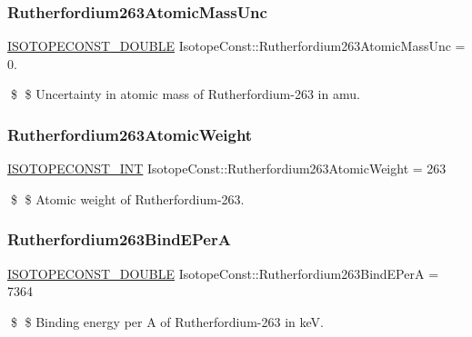 \subsubsection{\texorpdfstring{Rutherfordium263\+Atomic\+Mass\+Unc}{Rutherfordium263AtomicMassUnc}}
{\footnotesize\ttfamily \mbox{\hyperlink{group___isotope_const-_macros_ga8f45a7272ce02c0b4c65c44636ed719a}{I\+S\+O\+T\+O\+P\+E\+C\+O\+N\+S\+T\+\_\+\+D\+O\+U\+B\+LE}} Isotope\+Const\+::\+Rutherfordium263\+Atomic\+Mass\+Unc = 0.}

\$ \$ Uncertainty in atomic mass of Rutherfordium-\/263 in amu. \mbox{\label{group___isotope_const-_rutherfordium-_rf263_gae3bc559599657714de6118653ead2b63}} 
\subsubsection{\texorpdfstring{Rutherfordium263\+Atomic\+Weight}{Rutherfordium263AtomicWeight}}
{\footnotesize\ttfamily \mbox{\hyperlink{group___isotope_const-_macros_ga5f18360b3e99483a35c32d789e62621c}{I\+S\+O\+T\+O\+P\+E\+C\+O\+N\+S\+T\+\_\+\+I\+NT}} Isotope\+Const\+::\+Rutherfordium263\+Atomic\+Weight = 263}

\$ \$ Atomic weight of Rutherfordium-\/263. \mbox{\label{group___isotope_const-_rutherfordium-_rf263_gaf1a19caad9bb68ca7e47779b172a573d}} 
\subsubsection{\texorpdfstring{Rutherfordium263\+Bind\+E\+PerA}{Rutherfordium263BindEPerA}}
{\footnotesize\ttfamily \mbox{\hyperlink{group___isotope_const-_macros_ga8f45a7272ce02c0b4c65c44636ed719a}{I\+S\+O\+T\+O\+P\+E\+C\+O\+N\+S\+T\+\_\+\+D\+O\+U\+B\+LE}} Isotope\+Const\+::\+Rutherfordium263\+Bind\+E\+PerA = 7364}

\$ \$ Binding energy per A of Rutherfordium-\/263 in keV. \mbox{\label{group___isotope_const-_rutherfordium-_rf263_ga2b7370f06ca52f498ba7cba76658a5df}} 
